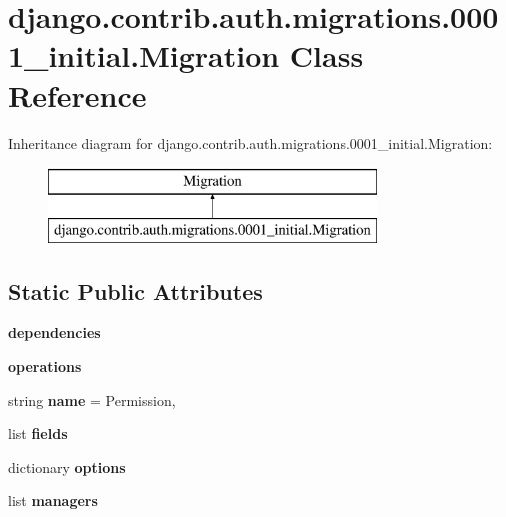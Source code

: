 \hypertarget{classdjango_1_1contrib_1_1auth_1_1migrations_1_10001__initial_1_1_migration}{}\section{django.\+contrib.\+auth.\+migrations.0001\+\_\+initial.Migration Class Reference}
\label{classdjango_1_1contrib_1_1auth_1_1migrations_1_10001__initial_1_1_migration}
Inheritance diagram for django.\+contrib.\+auth.\+migrations.0001\+\_\+initial.Migration\+:\begin{figure}[H]
\begin{center}
\leavevmode
\includegraphics[height=2.000000cm]{classdjango_1_1contrib_1_1auth_1_1migrations_1_10001__initial_1_1_migration}
\end{center}
\end{figure}
\subsection*{Static Public Attributes}
\begin{DoxyCompactItemize}
\item 
\mbox{\label{classdjango_1_1contrib_1_1auth_1_1migrations_1_10001__initial_1_1_migration_a7f4a4ffcddd01747d038601f67197ef0}} 
{\bfseries dependencies}
\item 
\mbox{\label{classdjango_1_1contrib_1_1auth_1_1migrations_1_10001__initial_1_1_migration_ad8b810dc33cfa9b21d9f56a2c3180e5c}} 
{\bfseries operations}
\item 
\mbox{\label{classdjango_1_1contrib_1_1auth_1_1migrations_1_10001__initial_1_1_migration_ab4ae7dc93dce3bbc37839efc1983d067}} 
string {\bfseries name} = \textquotesingle{}Permission\textquotesingle{},
\item 
list {\bfseries fields}
\item 
dictionary {\bfseries options}
\item 
list {\bfseries managers}
\end{DoxyCompactItemize}


